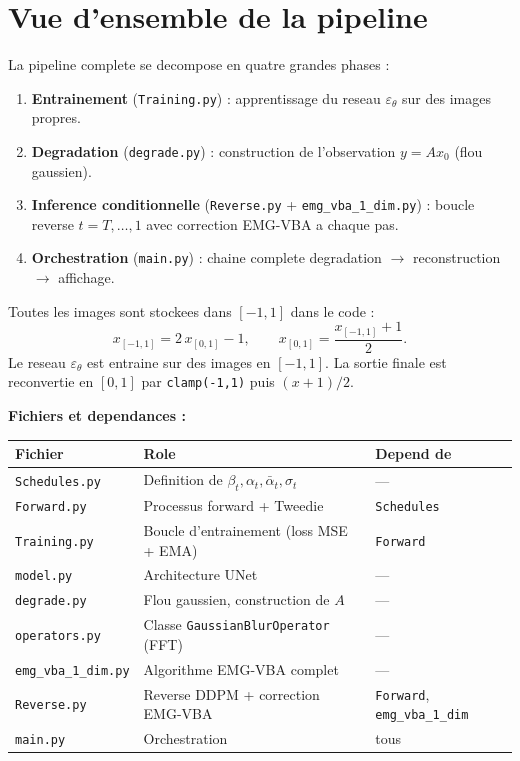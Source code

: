 \documentclass[12pt]{article}
\newcommand{\abar}{\bar{\alpha}}
\newcommand{\file}[1]{\texttt{\color{codeblue}#1}}
\newcommand{\func}[1]{\texttt{\color{codered}#1}}
\begin{document}
\section{Vue d'ensemble de la pipeline}

La pipeline complete se decompose en quatre grandes phases :

\begin{enumerate}[leftmargin=2em]
  \item \textbf{Entrainement} (\file{Training.py}) : apprentissage du reseau $\varepsilon_\theta$ sur des images propres.
  \item \textbf{Degradation} (\file{degrade.py}) : construction de l'observation $y = Ax_0$ (flou gaussien).
  \item \textbf{Inference conditionnelle} (\file{Reverse.py} + \file{emg\_vba\_1\_dim.py}) : boucle reverse $t = T, \ldots, 1$ avec correction EMG-VBA a chaque pas.
  \item \textbf{Orchestration} (\file{main.py}) : chaine complete degradation $\to$ reconstruction $\to$ affichage.
\end{enumerate}

\begin{remarkbox}
Toutes les images sont stockees dans $[-1,1]$ dans le code :
\[
  x_{[-1,1]} = 2\,x_{[0,1]} - 1, \qquad x_{[0,1]} = \frac{x_{[-1,1]}+1}{2}.
\]
Le reseau $\varepsilon_\theta$ est entraine sur des images en $[-1,1]$. La sortie finale est reconvertie en $[0,1]$ par \texttt{clamp(-1,1)} puis $(x+1)/2$.
\end{remarkbox}

\noindent\textbf{Fichiers et dependances :}
\begin{center}
\begin{tabular}{lll}
\toprule
\textbf{Fichier} & \textbf{Role} & \textbf{Depend de} \\
\midrule
\file{Schedules.py}       & Definition de $\beta_t, \alpha_t, \abar_t, \sigma_t$ & --- \\
\file{Forward.py}         & Processus forward + Tweedie              & \file{Schedules} \\
\file{Training.py}        & Boucle d'entrainement (loss MSE + EMA)   & \file{Forward} \\
\file{model.py}           & Architecture UNet                         & --- \\
\file{degrade.py}         & Flou gaussien, construction de $A$        & --- \\
\file{operators.py}       & Classe \func{GaussianBlurOperator} (FFT) & --- \\
\file{emg\_vba\_1\_dim.py} & Algorithme EMG-VBA complet               & --- \\
\file{Reverse.py}         & Reverse DDPM + correction EMG-VBA        & \file{Forward}, \file{emg\_vba\_1\_dim} \\
\file{main.py}            & Orchestration                             & tous \\
\bottomrule
\end{tabular}
\end{center}
\end{document}
